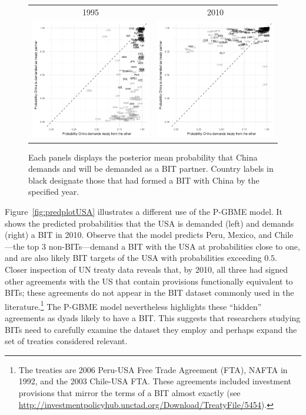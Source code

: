 \begin{figure}[ht]
	\centering
	\begin{tabular}{cc}
		1995 & 2010 \\
		\includegraphics[width=.4\textwidth]{figure1_a.pdf} & 
		\includegraphics[width=.4\textwidth]{figure1_b.pdf} \\
	\end{tabular}
	\caption{Each panels displays the posterior mean probability that China demands and will be demanded as a BIT partner. Country labels in black designate those that had formed a BIT with China by the specified year.}	
	\label{fig:predplotCHN}
\end{figure}
\FloatBarrier

Figure~\ref{fig:predplotUSA} illustrates a different use of the P-GBME model.  It shows the predicted probabilities that the USA is demanded (left) and demands (right) a BIT in 2010.  Observe that the model predicts Peru, Mexico, and Chile---the top 3 non-BITs---demand a BIT with the USA at probabilities close to one, and are also likely BIT targets of the USA with probabilities exceeding $0.5$. Closer inspection of UN treaty data reveals that, by 2010, all three had signed other agreements with the US that contain provisions functionally equivalent to BITs; these agreements do not appear in the BIT dataset commonly used in the literature.\footnote{The treaties are 2006 Peru-USA Free Trade Agreement (FTA), NAFTA in 1992, and the 2003 Chile-USA FTA. These agreements included investment provisions that mirror the terms of a BIT almost exactly (see \url{http://investmentpolicyhub.unctad.org/Download/TreatyFile/5454}).} The P-GBME model nevertheless highlights these ``hidden'' agreements as dyads likely to have a BIT. This suggests that researchers studying BITs need to carefully examine the dataset they employ and perhaps expand the set of treaties considered relevant.

